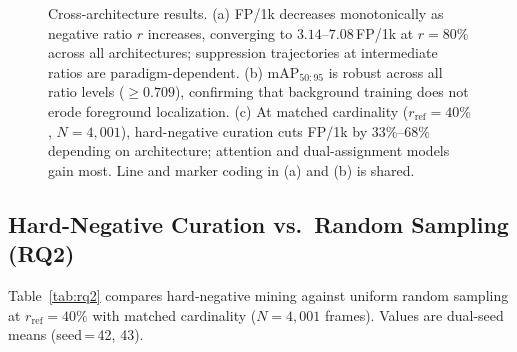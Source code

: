 \documentclass[conference]{IEEEtran}
\begin{document}
\begin{figure}[t]
\caption{Cross-architecture results.
(a) FP/1k decreases monotonically as negative ratio $r$ increases,
converging to $3.14$--$7.08$\,FP/1k at $r{=}80\%$ across all
architectures; suppression trajectories at intermediate ratios are
paradigm-dependent.
(b) $\mathrm{mAP}_{50:95}$ is robust across all ratio levels
(${\ge}0.709$), confirming that background training does not erode
foreground localization.
(c) At matched cardinality ($r_{\mathrm{ref}}{=}40\%$, $N{=}4{,}001$),
hard-negative curation cuts FP/1k by 33\%--68\% depending on
architecture; attention and dual-assignment models gain most.
Line and marker coding in (a) and (b) is shared.}
\label{fig:empirical_summary}
\end{figure}

\subsection{Hard-Negative Curation vs.\ Random Sampling (RQ2)}
\label{subsec:rq2_results}

Table~\ref{tab:rq2} compares hard-negative mining against uniform
random sampling at $r_{\mathrm{ref}}{=}40\%$ with matched
cardinality ($N{=}4{,}001$ frames). Values are dual-seed means
(seed\,=\,42, 43).
\end{document}

